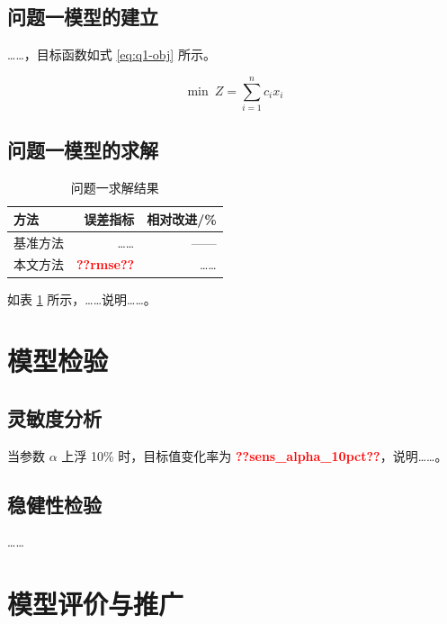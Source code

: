 \documentclass[UTF8,12pt,fontset=windows]{ctexart}
\newcommand{\res}[1]{\textcolor{red}{\textbf{??#1??}}}
\begin{document}
\subsection{问题一模型的建立}

……，目标函数如式 \eqref{eq:q1-obj} 所示。

\begin{equation}
  \min\ Z = \sum_{i=1}^{n} c_i x_i
  \label{eq:q1-obj}
\end{equation}

\subsection{问题一模型的求解}


\begin{table}[H]
  \centering
  \caption{问题一求解结果}\label{tab:q1-result}
  \begin{tabular}{lrr}
    \toprule
    方法 & 误差指标 & 相对改进/\% \\
    \midrule
    基准方法 & …… & —— \\
    本文方法 & \res{rmse} & …… \\
    \bottomrule
  \end{tabular}
\end{table}

如表 \ref{tab:q1-result} 所示，……说明……。

\section{模型检验}

\subsection{灵敏度分析}
当参数 $\alpha$ 上浮 10\% 时，目标值变化率为 \res{sens_alpha_10pct}，说明……。%

\subsection{稳健性检验}
……

\section{模型评价与推广}
\end{document}
